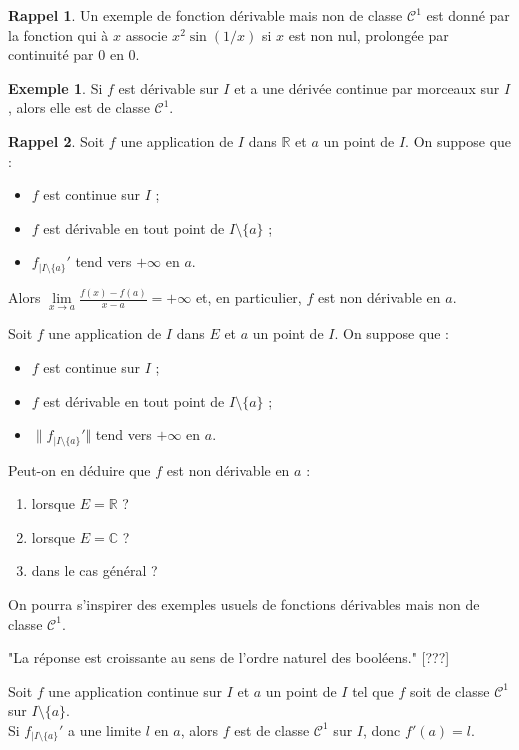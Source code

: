 \documentclass[french]{article}
\newcommand{\R}{\mathbb{R}}
\newcommand{\C}{\mathbb{C}}
\theoremstyle{plain}
\theoremstyle{definition}
\newtheorem*{ex}{Exemple}
\newtheorem*{rappel}{Rappel}
\theoremstyle{remark}
\begin{document}
\begin{rappel}
	Un exemple de fonction dérivable mais non de classe $\mathcal{C}^1$ est donné par la fonction qui à $x$ associe $x^2\sin(1/x)$ si $x$ est non nul, prolongée par continuité par $0$ en $0$.
\end{rappel}

\begin{ex}
	Si $f$ est dérivable sur $I$ et a une dérivée continue par morceaux sur $I$, alors elle est de classe $\mathcal{C}^1$.
\end{ex}

\begin{rappel}
	Soit $f$ une application de $I$ dans $\R$ et $a$ un point de $I$. On suppose que :
	\begin{itemize}
		\item $f$ est continue sur $I$ ;
		\item $f$ est dérivable en tout point de $I\setminus\{a\}$ ;
		\item $f_{\mid I\setminus\{a\}}'$ tend vers $+\infty$ en $a$.
	\end{itemize}
	Alors $\displaystyle\underset{x\to a}{\lim}\frac{f(x)-f(a)}{x-a}=+\infty$ et, en particulier, $f$ est non dérivable en $a$.
\end{rappel}

\begin{exo}[$\star$]
	Soit $f$ une application de $I$ dans $E$ et $a$ un point de $I$. On suppose que :
	\begin{itemize}
		\item $f$ est continue sur $I$ ;
		\item $f$ est dérivable en tout point de $I\setminus\{a\}$ ;
		\item $\lVert f_{\mid I\setminus\{a\}}'\Vert$ tend vers $+\infty$ en $a$.
	\end{itemize}
	Peut-on en déduire que $f$ est non dérivable en $a$ :
	\begin{enumerate}
		\item lorsque $E=\R$ ?
		\item lorsque $E=\C$ ?
		\item dans le cas général ?
	\end{enumerate}
	On pourra s'inspirer des exemples usuels de fonctions dérivables mais non de classe $\mathcal{C}^1$.
\end{exo}

"La réponse est croissante au sens de l'ordre naturel des booléens." [???]

\begin{cor}%
	Soit $f$ une application continue sur $I$ et $a$ un point de $I$ tel que $f$ soit de classe $\mathcal{C}^1$ sur $I\setminus\{a\}$.\\
	Si $f_{\mid I\setminus\{a\}}'$ a une limite $l$ en $a$, alors $f$ est de classe $\mathcal{C}^1$ sur $I$, donc $f'(a)=l$.
\end{cor}
\end{document}
